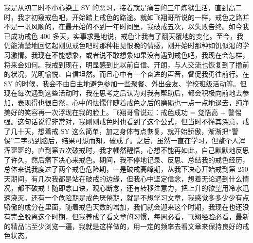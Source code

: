 \begin{case}
    我是从初二时不小心染上 SY 的恶习，接着就是痛苦的三年炼狱生活，直到高二时，我才初窥戒色吧，开始踏上戒色的路途。就如飞翔哥所说的一样，戒色之路并不是一帆风顺的，在最开始的不到一年时间里，我破戒五次，以失败告终。如今我已成功戒色 400 多天，实事求是地说，戒色让我有了翻天覆地的变化。至今，我仍能清楚地回忆起刚见戒色吧时那种相见恨晚的情感，刚开始时那种如饥似渴的学习激情。我现在不能想象，或者说不敢想象如果没有遇到戒色吧，我现在会怎样，将来会如何。我戒到现在，明显感到比以前自信、开朗，与人交流也恢复到了撸前的状况，光明愉悦、自信坦然。而且心中有一个奋进的声音，督促我勇往前行。在 SY 的时候，我会不由自主地避免参加一些聚餐、外出会友、学校班级活动等。但现在每次遇到这些活动时，我在思考之后认为对我有帮助后，都会积极向前地去参加，表现得也很自然，心中的怯懦伴随着戒色之后的磨砺也一点一点地退去，纯净美好的笑容再一次浮现在我的脸上。飞翔哥曾说过：戒色成功 = 觉悟高 + 警惕强。这句话说得非常对，我刚刚戒色时也看到了这个公式，但当时不懂其深意，戒了几十天，想着戒 SY 这么简单，加之身体有点恢复，就开始骄傲，渐渐把“警惕”二字扔到脑后，结果可想而知，破戒了。之后，虽然一直在学习，但整个人浑浑噩噩的，直到第五次破戒时，我才幡然醒悟，心想不能再如此，自己默默地反思了许久，然后痛下决心来戒色。期间，我不停地记录、反思、总结我的戒色经历，总体来说我度过了两个戒色危险期，一是破戒高峰期，从我下决心开始戒到第 250 天期间，有几次我都是站在破戒的边缘，但我心中坚定信念，想着无论遇到什么情况，都不破戒！随即念口诀，观心断念，还有转移注意力，把上升的欲望用冷水迅速浇灭。还有一个危险期是戒色厌倦期，就是不想学习文章，我感觉多多少少有点骄傲的成分在里面，随着戒色天数的增加，我们就会迎来这个时期，我现在也还没有完全脱离这个时期，但我养成了看文章的习惯，每周必看，飞翔经验必看，最新的精品帖至少浏览一遍，我就是这样做的，用一定的频率去看文章来保持良好的戒色状态。


\end{case}
